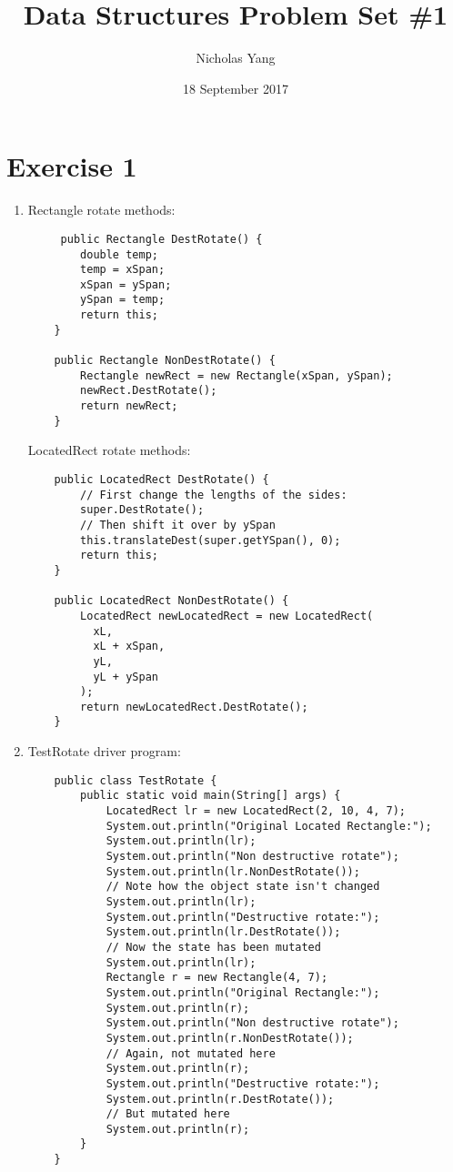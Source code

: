 \documentclass[12pt]{article}
\title{Data Structures Problem Set \#1}
\author{Nicholas Yang}
\date{18 September 2017}
\begin{document}
\maketitle
\section{Exercise 1}
\begin{enumerate}[label=(\alph*)]
\item Rectangle rotate methods:
  \begin{verbatim}
     public Rectangle DestRotate() {
        double temp;
        temp = xSpan;
        xSpan = ySpan;
        ySpan = temp;
        return this;
    }

    public Rectangle NonDestRotate() {
        Rectangle newRect = new Rectangle(xSpan, ySpan);
        newRect.DestRotate();
        return newRect;
    }
  \end{verbatim}
  LocatedRect rotate methods:
  \begin{verbatim}
    public LocatedRect DestRotate() {
        // First change the lengths of the sides:
        super.DestRotate();
        // Then shift it over by ySpan
        this.translateDest(super.getYSpan(), 0);
        return this;
    }

    public LocatedRect NonDestRotate() {
        LocatedRect newLocatedRect = new LocatedRect(
          xL,
          xL + xSpan,
          yL,
          yL + ySpan
        );
        return newLocatedRect.DestRotate();
    }
  \end{verbatim}

\item TestRotate driver program:
  \begin{verbatim}
    public class TestRotate {
        public static void main(String[] args) {
            LocatedRect lr = new LocatedRect(2, 10, 4, 7);
            System.out.println("Original Located Rectangle:");
            System.out.println(lr);
            System.out.println("Non destructive rotate");
            System.out.println(lr.NonDestRotate());
            // Note how the object state isn't changed
            System.out.println(lr);
            System.out.println("Destructive rotate:");
            System.out.println(lr.DestRotate());
            // Now the state has been mutated
            System.out.println(lr);
            Rectangle r = new Rectangle(4, 7);
            System.out.println("Original Rectangle:");
            System.out.println(r);
            System.out.println("Non destructive rotate");
            System.out.println(r.NonDestRotate());
            // Again, not mutated here
            System.out.println(r);
            System.out.println("Destructive rotate:");
            System.out.println(r.DestRotate());
            // But mutated here
            System.out.println(r);
        }
    }
  \end{verbatim}
\end{enumerate}
\end{document}
